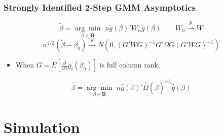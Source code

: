 \documentclass{beamer}
\begin{document}
\begin{frame}
\frametitle{ Strongly Identified 2-Step GMM Asymptotics }

\begin{center}  \end{center}
\begin{equation*} \tilde{\beta}=\underset{\beta \in \mathbf{B}}{\arg \min} \hspace{4pt}n\hat{g}(\beta)'W_n\hat{g}(\beta)\qquad
 W_n\overset{p}{\rightarrow} W \end{equation*}
\vspace{1pt}
\begin{equation*} n^{1/2}(\tilde{\beta}-\beta_0)\overset{d}{\rightarrow} N(0,(G'WG)^{-1}G'\Omega G (G'WG)^{-1})\end{equation*}
\begin{itemize}
\vspace{10pt}
\item[] When $G=E[\frac{\partial}{\partial \beta } g_i(\beta_0)]$ is full column rank.
\end{itemize}

\vspace{10pt}
\begin{center}  \end{center}

  \begin{equation*} \hat{\beta}=\underset{\beta \in \mathbf{B}}{\arg \min} \hspace{4pt} n\hat{g}(\beta)'\hat{\Omega}(\tilde{\beta})^{-1}\hat{g}(\beta)\end{equation*}

\end{frame}





\section{Simulation}
\end{document}

